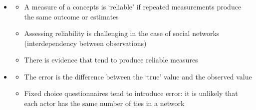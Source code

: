 \documentclass[8pt]{beamer}
\begin{document}
\begin{frame}
\frametitle{\insertsection}

\begin{itemize}
    
\item {\color{blue}{Reliability}} 
    \begin{itemize}
    \item A measure of a concepts is `reliable' if repeated measurements produce the same outcome or estimates
    \item Assessing reliability is challenging in the case of social networks (interdependency between observations)
    \item There is evidence that {\color{dkgreen}{complete ranking questionnaires}} tend to produce reliable measures
    \end{itemize}
    
\medskip

\item {\color{blue}{Error}} 
    \begin{itemize}
    \item The error is the difference between the `true' value and the observed value
    \item Fixed choice questionnaires tend to introduce error: it is unlikely that each actor has the same number of ties in a network
    \end{itemize}
    
\end{itemize}

\end{frame}


\end{document}

